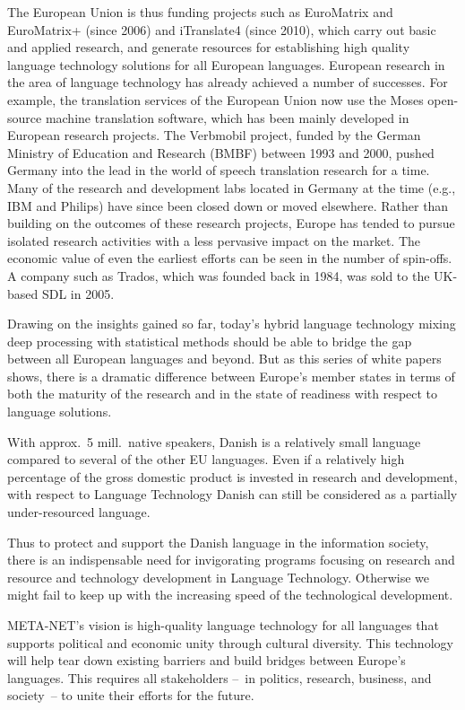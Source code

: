 \begin{multicols}{2}
The European Union is thus funding projects such as EuroMatrix and EuroMatrix+  (since 2006) and iTranslate4 (since 2010), which carry out basic and applied research, and generate resources for establishing high quality language technology solutions for all European languages. 
European research in the area of language technology has already achieved a number of successes. For example, the translation services of the European Union now use the Moses open-source machine translation software, which has been mainly developed in European research projects. The Verbmobil project, funded by the German Ministry of Education and Research (BMBF) between 1993 and 2000, pushed Germany into the lead in the world of speech translation research for a time. Many of the research and development labs located in Germany at the time (e.g., IBM and Philips) have since been closed down or moved elsewhere. Rather than building on the outcomes of these research projects, Europe has tended to pursue isolated research activities with a less pervasive impact on the market. The economic value of even the earliest efforts can be seen in the number of spin-offs. A company such as Trados, which was founded back in 1984, was sold to the UK-based SDL in 2005.


Drawing on the insights gained so far, today’s hybrid language technology mixing deep processing with statistical methods should be able to bridge the gap between all European languages and beyond. But as this series of white papers shows, there is a dramatic difference between Europe’s member states in terms of both the maturity of the research and in the state of readiness with respect to language solutions.

With approx.\ 5 mill.\ native speakers, Danish is a relatively small language compared to several of the other EU languages. Even if a relatively high percentage of the gross domestic pro\-duct is invested in research and development, with respect to Language Technology Danish can still be considered as a partially under-resourced language.

Thus to protect and support the Danish language in the information society, there is an indispensable need for invigorating programs focusing on  research and resource and technology development in 
Language Technology. Otherwise we might fail to keep up with the increasing speed of the technological development.

META-NET’s vision is high-quality language technology for all languages that supports political and economic unity through cultural diversity. This technology will help tear down existing barriers and build bridges between Europe’s languages. This requires all stakeholders --~in politics, research, business, and society~-- to unite their efforts for the future.


\end{multicols}
